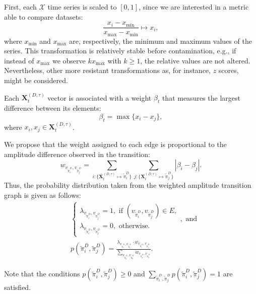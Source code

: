 \documentclass[journal]{IEEEtran}
\begin{document}
	First, each $\mathcal{X}$ time series is scaled to $[0, 1]$, since we are interested in a metric able to compare datasets:
	\begin{equation}
	\frac{x_i - x_{\min}}{x_{\max} - x_{\min}} \longmapsto x_i,
	\end{equation}
	where $x_{\min}$ and $x_{\max}$ are, respectively, the minimum and maximum values of the series.
	This transformation is relatively stable before contamination, e.g., if instead of $x_{\max}$ we observe $k x_{\max}$ with $k\geq 1$, the relative values are not altered. Nevertheless, other more resistant transformations as, for instance, $z$ scores, might be considered.
	
	Each $\mathbf{X}^{(D, \tau)}_t$ vector is associated with a weight $\beta_t$ that measures the largest difference between its elements:
	\begin{equation}
	\beta_t = \max\{x_i - x_j\},
	\end{equation}
	where $x_i, x_j \in \mathbf{X}^{(D, \tau)}_t$.
	
	We propose that the weight assigned to each edge is proportional to the amplitude difference observed in the transition:	
	\begin{equation}
	w_{v_{\widetilde \pi^D_i}, v_{\widetilde \pi^D_j}} =  \sum_{i : \{\mathbf{X}^{(D,\tau)}_t \mapsto \widetilde\pi^D_i\}} \sum_{j : \{\mathbf{X}^{(D,\tau)}_t \mapsto \widetilde\pi^D_j\}} |\beta_i - \beta_j| .
	\end{equation}
	Thus, the probability distribution taken from the weighted amplitude transition graph is given as follows:	
	\begin{align}
	&\left\{\begin{array}{l}
	\lambda_{v_{\widetilde\pi^D_i}, v_{\widetilde\pi^D_j}} = 1, \text{ if } (v_{\widetilde\pi^D_i}, v_{\widetilde\pi^D_j}) \in {E}, \\
	\lambda_{v_{\widetilde\pi^D_i}, v_{\widetilde\pi^D_j}} = 0, \text{ otherwise}.
	\end{array}\right., \text{ and} \\
	&p(\widetilde\pi^D_i, \widetilde\pi^D_j) = \frac{\lambda_{v_{\widetilde\pi^D_i}, v_{\widetilde\pi^D_j}} \cdot w_{v_{\widetilde\pi^D_i}, v_{\widetilde\pi^D_j}}}{\sum_{v_{\widetilde\pi^D_a}, v_{\widetilde\pi^D_b}} w_{v_{\widetilde\pi^D_a}, v_{\widetilde\pi^D_b}}}.
	\end{align}
	
	Note that the conditions $p(\widetilde\pi^D_i, \widetilde\pi^D_j) \ge 0$ and $\sum_{\widetilde\pi^D_i, \widetilde\pi^D_j} p(\widetilde\pi^D_i, \widetilde\pi^D_j) = 1$ are satisfied.
	
\end{document}
